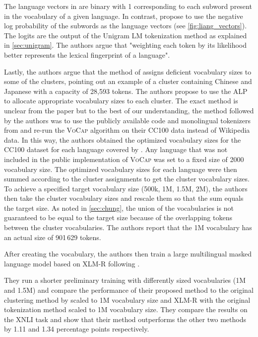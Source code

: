 The language vectors in \citet{chung_improving_2020} are binary with 1 corresponding to each subword present in the vocabulary of a given language. In contrast, \citet{liang_xlm-v_2023} propose to use the negative log probability of the subwords as the language vectors (see \autoref{fig:liang_vectors}). The logits are the output of the Unigram LM tokenization method as explained in \autoref{sec:unigram}. The authors argue that "weighting each token by its likelihood better represents the lexical fingerprint of a language".

Lastly, the authors argue that the method of \citet{chung_improving_2020} assigns deficient vocabulary sizes to some of the clusters, pointing out an example of a cluster containing Chinese and Japanese with a capacity of 28,593 tokens. The authors propose to use the ALP to allocate appropriate vocabulary sizes to each cluster. The exact method is unclear from the paper but to the best of our understanding, the method followed by the authors was to use the publicly available code and monolingual tokenizers from \citet{zheng_allocating_2021} and re-run the \textsc{VoCap} algorithm on their CC100 data instead of Wikipedia data. In this way, the authors obtained the optimized vocabulary sizes for the CC100 dataset for each language covered by \citet{zheng_allocating_2021}. Any language that was not included in the public implementation of \textsc{VoCap} was set to a fixed size of 2000 vocabulary size. The optimized vocabulary sizes for each language were then summed according to the cluster assignments to get the cluster vocabulary sizes. To achieve a specified target vocabulary size (500k, 1M, 1.5M, 2M), the authors then take the cluster vocabulary sizes and rescale them so that the sum equals the target size. As noted in \autoref{sec:chung}, the union of the vocabularies is not guaranteed to be equal to the target size because of the overlapping tokens between the cluster vocabularies. The authors report that the 1M vocabulary has an actual size of 901\,629 tokens.

After creating the vocabulary, the authors then train a large multilingual masked language model based on XLM-R following \citet{conneau_unsupervised_2020}. 

They run a shorter preliminary training with differently sized vocabularies (1M and 1.5M) and compare the performance of their proposed method to the original clustering method by \citet{chung_improving_2020} scaled to 1M vocabulary size and XLM-R with the original tokenization method scaled to 1M vocabulary size. They compare the results on the XNLI task and show that their method outperforms the other two methods by 1.11 and 1.34 percentage points respectively. 

